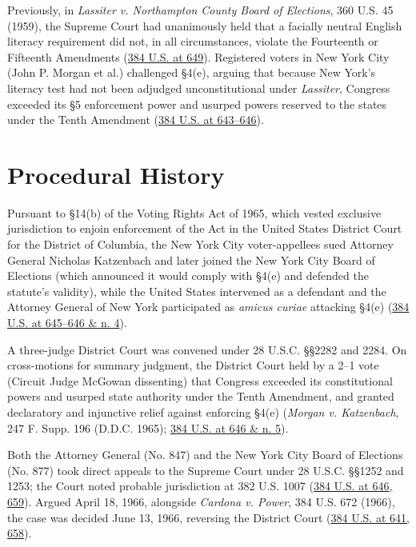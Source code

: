 \documentclass[12pt]{article}
\begin{document}
Previously, in \textit{Lassiter v. Northampton County Board of Elections}, 360 U.S. 45 (1959), the Supreme Court had unanimously held that a facially neutral English literacy requirement did not, in all circumstances, violate the Fourteenth or Fifteenth Amendments (\href{https://supreme.justia.com/cases/federal/us/384/641/}{384 U.S. at 649}). Registered voters in New York City (John P. Morgan et al.) challenged \S 4(e), arguing that because New York's literacy test had not been adjudged unconstitutional under \textit{Lassiter}, Congress exceeded its \S 5 enforcement power and usurped powers reserved to the states under the Tenth Amendment (\href{https://supreme.justia.com/cases/federal/us/384/641/}{384 U.S. at 643--646}).

\section{Procedural History}

Pursuant to \S 14(b) of the Voting Rights Act of 1965, which vested exclusive jurisdiction to enjoin enforcement of the Act in the United States District Court for the District of Columbia, the New York City voter-appellees sued Attorney General Nicholas Katzenbach and later joined the New York City Board of Elections (which announced it would comply with \S 4(e) and defended the statute's validity), while the United States intervened as a defendant and the Attorney General of New York participated as \textit{amicus curiae} attacking \S 4(e) (\href{https://supreme.justia.com/cases/federal/us/384/641/}{384 U.S. at 645--646 \& n. 4}).

A three-judge District Court was convened under 28 U.S.C. \S\S 2282 and 2284. On cross-motions for summary judgment, the District Court held by a 2--1 vote (Circuit Judge McGowan dissenting) that Congress exceeded its constitutional powers and usurped state authority under the Tenth Amendment, and granted declaratory and injunctive relief against enforcing \S 4(e) (\textit{Morgan v. Katzenbach}, 247 F. Supp. 196 (D.D.C. 1965); \href{https://supreme.justia.com/cases/federal/us/384/641/}{384 U.S. at 646 \& n. 5}).

Both the Attorney General (No. 847) and the New York City Board of Elections (No. 877) took direct appeals to the Supreme Court under 28 U.S.C. \S\S 1252 and 1253; the Court noted probable jurisdiction at 382 U.S. 1007 (\href{https://supreme.justia.com/cases/federal/us/384/641/}{384 U.S. at 646, 659}). Argued April 18, 1966, alongside \textit{Cardona v. Power}, 384 U.S. 672 (1966), the case was decided June 13, 1966, reversing the District Court (\href{https://supreme.justia.com/cases/federal/us/384/641/}{384 U.S. at 641, 658}).
\end{document}
